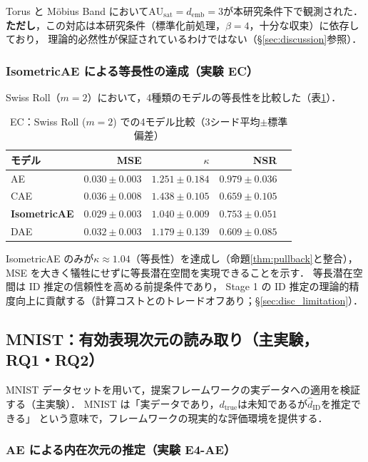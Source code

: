 \documentclass[11pt,a4paper]{jsarticle}
\newcommand{\dtrue}{d_{\mathrm{true}}}
\newcommand{\kap}{\kappa}
\newcommand{\AUsat}{\mathrm{AU}_{\mathrm{sat}}}
\newcommand{\demb}{d_{\mathrm{emb}}}
\begin{document}
Torus と Möbius Band において$\AUsat = \demb = 3$が本研究条件下で観測された．
\textbf{ただし}，この対応は本研究条件（標準化前処理，$\beta = 4$，十分な収束）に依存しており，
理論的必然性が保証されているわけではない（§\ref{sec:discussion}参照）．

\subsubsection{IsometricAE による等長性の達成（実験 EC）}

Swiss Roll（$m = 2$）において，4種類のモデルの等長性を比較した（表\ref{tab:ec}）．

\begin{table}[H]
\centering
\caption{EC：Swiss Roll ($m=2$) での4モデル比較（3シード平均$\pm$標準偏差）}
\label{tab:ec}
\small
\begin{tabular}{lrrrr}
\toprule
モデル & MSE & $\kap$ & NSR \\
\midrule
AE & $0.030\pm0.003$ & $1.251\pm0.184$ & $0.979\pm0.036$ \\
CAE & $0.036\pm0.008$ & $1.438\pm0.105$ & $0.659\pm0.105$ \\
\textbf{IsometricAE} & $\boldsymbol{0.029\pm0.003}$ & $\boldsymbol{1.040\pm0.009}$ & $0.753\pm0.051$ \\
DAE & $0.032\pm0.003$ & $1.179\pm0.139$ & $0.609\pm0.085$ \\
\bottomrule
\end{tabular}
\end{table}

IsometricAE のみが$\kap \approx 1.04$（等長性）を達成し（命題\ref{thm:pullback}と整合），
MSE を大きく犠牲にせずに等長潜在空間を実現できることを示す．
等長潜在空間は ID 推定の信頼性を高める前提条件であり，
Stage 1 の ID 推定の理論的精度向上に貢献する（計算コストとのトレードオフあり；§\ref{sec:disc_limitation}）．

\subsection{MNIST：有効表現次元の読み取り（主実験，RQ1・RQ2）}\label{sec:exp_mnist}

MNIST データセットを用いて，提案フレームワークの実データへの適用を検証する（主実験）．
MNIST は「実データであり，$\dtrue$は未知であるが$\hat{d}_\mathrm{ID}$を推定できる」
という意味で，フレームワークの現実的な評価環境を提供する．

\subsubsection{AE による内在次元の推定（実験 E4-AE）}
\end{document}
